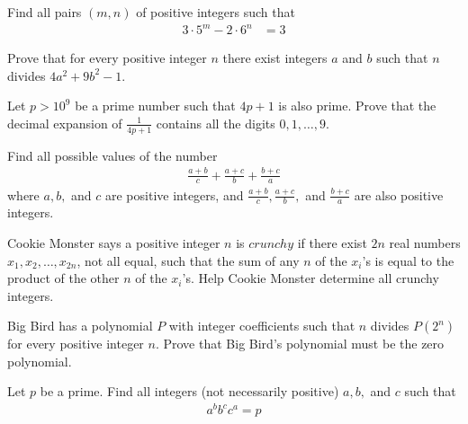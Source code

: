 \begin{problem}
	Find all pairs $(m, n)$ of positive integers such that
	\begin{align*}
		3 \cdot 5^m - 2\cdot 6^n
			& = 3
	\end{align*}
\end{problem}

\begin{problem}
	Prove that for every positive integer $n$ there exist integers $a$ and $b$ such that $n$ divides $4a^2 + 9b^2 - 1$.
\end{problem}

\begin{problem}
	Let $p > 10^9$ be a prime number such that $4p + 1$ is also prime.
	Prove that the decimal expansion of $\frac{1}{4p+1}$ contains all the digits $0,1, \ldots, 9$. %
\end{problem}

\begin{problem}
	Find all possible values of the number
	\begin{align*}
		\frac{a+b}{c}+ \frac{a+c}{b}+ \frac{b+c}{a}
	\end{align*}
	where $a, b,$ and $c$ are positive integers, and $\frac{a+b}{c}, \frac{a+c}{b},$ and $\frac{b+c}{a}$ are also positive integers.
\end{problem}

\begin{problem}[ELMO 2016]
	Cookie Monster says a positive integer $n$ is $crunchy$ if there exist $2n$ real numbers $x_1,x_2,\ldots,x_{2n}$, not all equal, such that the sum of any $n$ of the $x_i$'s is equal to the product of the other $n$ of the $x_i$'s. Help Cookie Monster determine all crunchy integers. %
\end{problem}

\begin{problem}[ELMO $2016$]
	Big Bird has a polynomial $P$ with integer coefficients such that $n$ divides $P(2^n)$ for every positive integer $n$. Prove that Big Bird's polynomial must be the zero polynomial. %
\end{problem}

\begin{problem}
	Let $p$ be a prime. Find all integers (not necessarily positive) $a,b,$ and $c$ such that
	\begin{align*}
		a^bb^cc^a = p
	\end{align*}
\end{problem}

